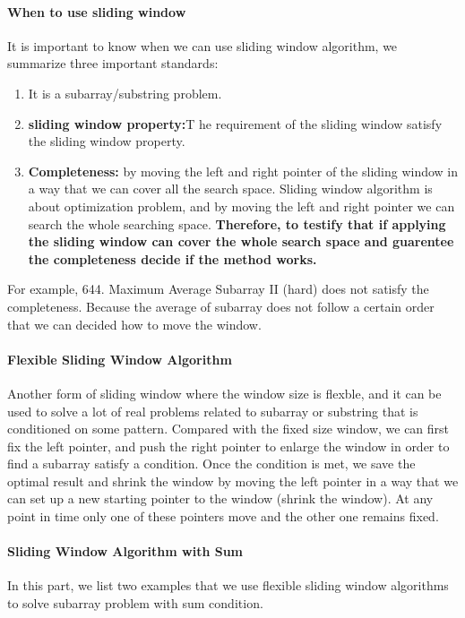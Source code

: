 \documentclass[../searching.tex]{subfiles}
\begin{document}
\paragraph{When to use sliding window} It is important to know when we can use sliding window algorithm, we summarize three important standards:
\begin{enumerate}
    \item It is a subarray/substring problem.
    \item \textbf{sliding window property:}T he requirement of the sliding window satisfy the sliding window property.
    \item \textbf{Completeness:} by moving the left and right pointer of the sliding window in a way that we can cover all the search space. Sliding window algorithm is about optimization problem, and by moving the left and right pointer we can search the whole searching space. \textbf{Therefore, to testify that if applying the sliding window can cover the whole search space and guarentee the completeness decide if the method works.}
\end{enumerate}

For example, 644. Maximum Average Subarray II (hard) does not satisfy the completeness. Because the average of subarray does not follow a certain order that we can decided how to move the window. 

\paragraph{Flexible Sliding Window Algorithm} Another form of sliding window where the window size is flexble, and it can be used to solve a lot of real problems related to subarray or substring that is conditioned on some pattern. Compared with the fixed size window, we can first fix the left pointer, and push the right pointer to enlarge the window in order to find a subarray satisfy a condition. Once the condition is met, we save the optimal result and shrink the window by moving the left pointer in a way that we can set up a new starting pointer to the window (shrink the window). At any point in time only one of these pointers move and the other one remains fixed.


\paragraph{Sliding Window Algorithm with Sum} In this part, we list two examples that we use flexible sliding window algorithms to solve subarray problem with sum condition. 
\end{document}
